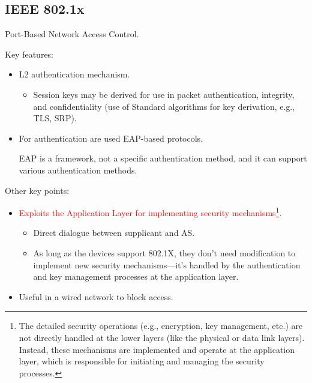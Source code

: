 \clearpage

\subsection{IEEE 802.1x}
\begin{center}
    Port-Based Network Access Control.
\end{center}

Key features:
\begin{itemize}
    \item L2 authentication mechanism.
    \begin{itemize}
        \item Session keys may be derived for use in packet authentication, integrity, and confidentiality (use of Standard algorithms for key derivation, e.g., TLS, SRP).
    \end{itemize}
    \item For authentication are used EAP-based protocols.
    \begin{tcolorbox}[colback=red!10!white, colframe=red!70!black, coltitle=white, title=Be aware] 
        EAP is a framework, not a specific authentication method, and it can support various authentication methods.
    \end{tcolorbox}
\end{itemize}

Other key points:
\begin{itemize}
    \item \textcolor{red}{Exploits the Application Layer for implementing security mechanisms\footnote{The detailed security operations (e.g., encryption, key management, etc.) are not directly handled at the lower layers (like the physical or data link layers). Instead, these mechanisms are implemented and operate at the application layer, which is responsible for initiating and managing the security processes.}.}
    \begin{itemize}
        \item Direct dialogue between supplicant and AS.
        \item As long as the devices support 802.1X, they don't need modification to implement new security mechanisms—it's handled by the authentication and key management processes at the application layer.
    \end{itemize}
    \item Useful in a wired network to block access.
\end{itemize}

